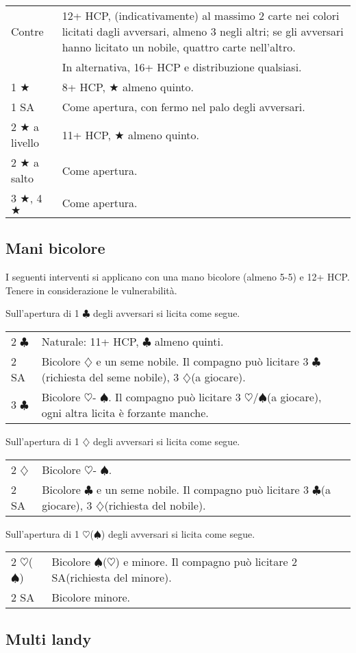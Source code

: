 \documentclass[a4paper,10pt]{article}
\renewcommand{\c}{$\clubsuit$\xspace}
\renewcommand{\d}{$\diamondsuit$\xspace}
\newcommand{\h}{$\heartsuit$\xspace}
\newcommand{\s}{$\spadesuit$\xspace}
\renewcommand{\j}{$\bigstar$\xspace}
\newcommand{\sa}{SA\xspace}
\newcommand{\smallspace}{\vskip0.3cm}
\newenvironment{twocol}
  {\smallspace\noindent\begin{tabular}{l p{0.78\textwidth}}}
  {\end{tabular}\smallspace}
\begin{document}
\begin{twocol}
  Contre & 12+ HCP, (indicativamente) al massimo 2 carte nei colori licitati dagli avversari, almeno 3 negli altri; se gli avversari hanno licitato un nobile, quattro carte nell'altro. \\
  & In alternativa, 16+ HCP e distribuzione qualsiasi.\\
  1 \j & 8+ HCP, \j almeno quinto.\\
  1 \sa & Come apertura, con fermo nel palo degli avversari.\\
  2 \j a livello & 11+ HCP, \j almeno quinto.\\
  2 \j a salto & Come apertura.\\
  3 \j, 4 \j & Come apertura.
\end{twocol}

\subsection{Mani bicolore}

I seguenti interventi si applicano con una mano bicolore (almeno 5-5) e 12+ HCP. Tenere in considerazione le vulnerabilità.

Sull'apertura di 1 \c degli avversari si licita come segue.
\begin{twocol}
  2 \c & Naturale: 11+ HCP, \c almeno quinti.\\
  2 \sa & Bicolore \d e un seme nobile. Il compagno può licitare 3 \c (richiesta del seme nobile), 3 \d (a giocare).\\
  3 \c & Bicolore \h - \s. Il compagno può licitare 3 \h/\s (a giocare), ogni altra licita è forzante manche.
\end{twocol}

Sull'apertura di 1 \d degli avversari si licita come segue.
\begin{twocol}
  2 \d & Bicolore \h - \s.\\
  2 \sa & Bicolore \c e un seme nobile. Il compagno può licitare 3 \c (a giocare), 3 \d (richiesta del nobile).
\end{twocol}

Sull'apertura di 1 \h (\s) degli avversari si licita come segue.
\begin{twocol}
  2 \h (\s) & Bicolore \s (\h) e minore. Il compagno può licitare 2 \sa (richiesta del minore).\\
  2 \sa & Bicolore minore.
\end{twocol}

\subsection{Multi landy}
\end{document}
